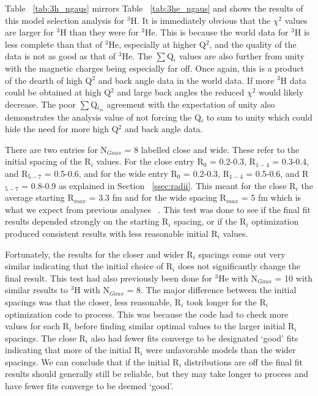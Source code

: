 Table ~\ref{tab:3h_ngaus} mirrors Table ~\ref{tab:3he_ngaus} and shows the results of this model selection analysis for $^3$H. It is immediately obvious that the $\chi^2$ values are larger for $^3$H than they were for $^3$He. This is because the world data for $^3$H is less complete than that of $^3$He, especially at higher Q$^2$, and the quality of the data is not as good as that of $^3$He. The $\sum$Q$_i$ values are also further from unity with the magnetic charges being especially far off. Once again, this is a product of the dearth of high Q$^2$ and back angle data in the world data. If more $^3$H data could be obtained at high Q$^2$ and large back angles the reduced $\chi^2$ would likely decrease. The poor $\sum$Q$_{i_{m}}$ agreement with the expectation of unity also demonstrates the analysis value of not forcing the Q$_i$ to sum to unity which could hide the need for more high Q$^2$ and back angle data.

There are two entries for N$_{Gaus}$ = 8 labelled close and wide. These refer to the initial spacing of the R$_i$ values. For the close entry R$_0$ = 0.2-0.3, R$_{1-4}$ = 0.3-0.4, and R$_{5-7}$ = 0.5-0.6, and for the wide entry R$_0$ = 0.2-0.3, R$_{1-4}$ = 0.5-0.6, and R$_{5-7}$ = 0.8-0.9 as explained in Section ~\ref{ssec:radii}. This meant for the close R$_i$ the average starting R$_{max}$ = 3.3 fm and for the wide spacing R$_{max}$ = 5 fm which is what we expect from previous analyses ~\cite{Article:Amroun}. This test was done to see if the final fit results depended strongly on the starting R$_i$ spacing, or if the R$_i$ optimization produced consistent results with less reasonable initial R$_i$ values.

Fortunately, the results for the closer and wider R$_i$ spacings come out very similar indicating that the initial choice of R$_i$ does not significantly change the final result. This test had also previously been done for $^3$He with N$_{Gaus}$ = 10 with similar results to $^3$H with N$_{Gaus}$ = 8. The major difference between the initial spacings was that the closer, less reasonable, R$_i$ took longer for the R$_i$ optimization code to process. This was because the code had to check more values for each R$_i$ before finding similar optimal values to the larger initial R$_i$ spacings. The close R$_i$ also had fewer fits converge to be designated `good' fits indicating that more of the initial R$_i$ were unfavorable models than the wider spacings. We can conclude that if the initial R$_i$ distributions are off the final fit results should generally still be reliable, but they may take longer to process and have fewer fits converge to be deemed `good'.  

